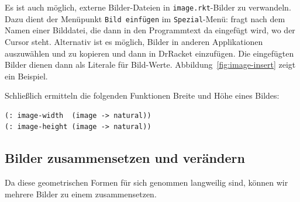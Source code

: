 Es ist auch möglich, externe Bilder-Dateien in
\texttt{image.rkt}-Bilder zu verwandeln.  Dazu dient der Menüpunkt
\texttt{Bild einfügen} im \texttt{Spezial}-Menü: \drscheme{} fragt
nach dem Namen einer Bilddatei, die dann in den Programmtext da
eingefügt wird, wo der Cursor steht.  Alternativ ist es möglich,
Bilder in anderen Applikationen auszuwählen und zu kopieren und dann
in DrRacket einzufügen.  Die eingefügten Bilder dienen dann als
Literale für Bild-Werte.  Abbildung~\ref{fig:image-insert} zeigt ein
Beispiel.

Schließlich ermitteln die folgenden Funktionen Breite und Höhe
eines Bildes:
%
\begin{lstlisting}
(: image-width  (image -> natural))
(: image-height (image -> natural))
\end{lstlisting}
%

\subsection{Bilder zusammensetzen und verändern}

Da diese geometrischen Formen für sich genommen langweilig sind,
können wir mehrere Bilder zu einem zusammensetzen.

